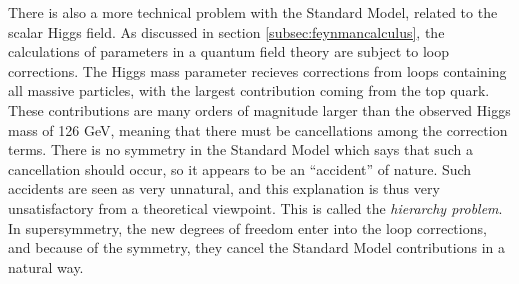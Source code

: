 There is also a more technical problem with the Standard Model, related to the scalar Higgs field. As discussed in section \ref{subsec:feynmancalculus}, the calculations of parameters in a quantum field theory are subject to loop corrections. The Higgs mass parameter recieves corrections from loops containing all massive particles, with the largest contribution coming from the top quark. These contributions are many orders of magnitude larger than the observed Higgs mass of 126 GeV, meaning that there must be cancellations among the correction terms. There is no symmetry in the Standard Model which says that such a cancellation should occur, so it appears to be an ``accident'' of nature. Such accidents are seen as very unnatural, and this explanation is thus very unsatisfactory from a theoretical viewpoint. This is called the {\it hierarchy problem}. In supersymmetry, the new degrees of freedom enter into the loop corrections, and because of the symmetry, they cancel the Standard Model contributions in a natural way. 











